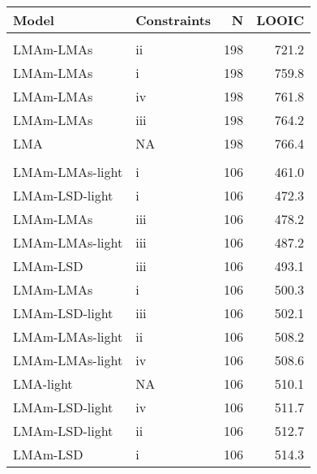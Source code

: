 \documentclass[
  12pt,
  letterpaper,
  DIV=11,
  numbers=noendperiod]{scrartcl}
\begin{document}
\begin{table}
\centering
\begin{tabular}{llrr}
\toprule
Model & Constraints & N & LOOIC\\
\midrule
\addlinespace[0.3em]
\multicolumn{4}{l}{\textbf{GLOPNET}}\\
\hspace{1em}LMAm-LMAs & ii & 198 & 721.2\\
\hspace{1em}LMAm-LMAs & i & 198 & 759.8\\
\hspace{1em}LMAm-LMAs & iv & 198 & 761.8\\
\hspace{1em}LMAm-LMAs & iii & 198 & 764.2\\
\hspace{1em}LMA & NA & 198 & 766.4\\
\addlinespace[0.3em]
\multicolumn{4}{l}{\textbf{Panama}}\\
\hspace{1em}LMAm-LMAs-light & i & 106 & 461.0\\
\hspace{1em}LMAm-LSD-light & i & 106 & 472.3\\
\hspace{1em}LMAm-LMAs & iii & 106 & 478.2\\
\hspace{1em}LMAm-LMAs-light & iii & 106 & 487.2\\
\hspace{1em}LMAm-LSD & iii & 106 & 493.1\\
\hspace{1em}LMAm-LMAs & i & 106 & 500.3\\
\hspace{1em}LMAm-LSD-light & iii & 106 & 502.1\\
\hspace{1em}LMAm-LMAs-light & ii & 106 & 508.2\\
\hspace{1em}LMAm-LMAs-light & iv & 106 & 508.6\\
\hspace{1em}LMA-light & NA & 106 & 510.1\\
\hspace{1em}LMAm-LSD-light & iv & 106 & 511.7\\
\hspace{1em}LMAm-LSD-light & ii & 106 & 512.7\\
\hspace{1em}LMAm-LSD & i & 106 & 514.3\\

\end{tabular}
\end{table}
\end{document}
